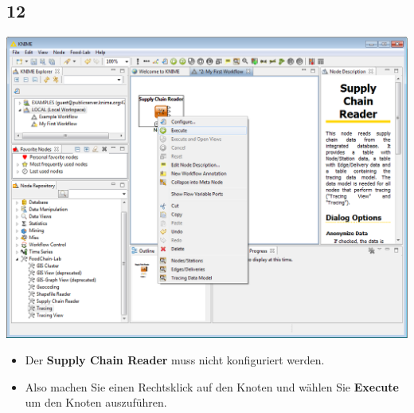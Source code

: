\documentclass{beamer}
\begin{document}
\subsection{12}
\begin{frame}
	\begin{center}
  		\includegraphics[height=0.6\textheight]{12.png}
	\end{center}
	\begin{itemize}
		\item Der \textbf{Supply Chain Reader} muss nicht konfiguriert werden.
		\item Also machen Sie einen Rechtsklick auf den Knoten und wählen Sie \textbf{Execute} um den Knoten auszuführen.
	\end{itemize}
\end{frame}
\end{document}

